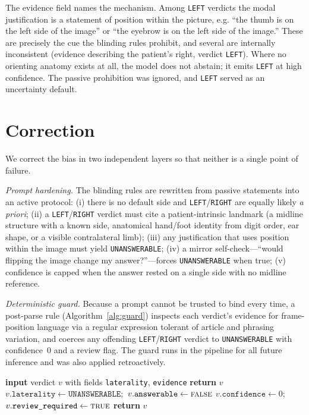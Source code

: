 \documentclass[conference]{IEEEtran}
\begin{document}
The evidence field names the mechanism. Among \texttt{LEFT} verdicts the modal justification is a statement of position within the picture, e.g. ``the thumb is on the left side of the image'' or ``the eyebrow is on the left side of the image.'' These are precisely the cue the blinding rules prohibit, and several are internally inconsistent (evidence describing the patient's right, verdict \texttt{LEFT}). Where no orienting anatomy exists at all, the model does not abstain; it emits \texttt{LEFT} at high confidence. The passive prohibition was ignored, and \texttt{LEFT} served as an uncertainty default.

\section{Correction}\label{sec:fix}
We correct the bias in two independent layers so that neither is a single point of failure.

\emph{Prompt hardening.} The blinding rules are rewritten from passive statements into an active protocol: (i) there is no default side and \texttt{LEFT}/\texttt{RIGHT} are equally likely \emph{a priori}; (ii) a \texttt{LEFT}/\texttt{RIGHT} verdict must cite a patient-intrinsic landmark (a midline structure with a known side, anatomical hand/foot identity from digit order, ear shape, or a visible contralateral limb); (iii) any justification that uses position within the image must yield \texttt{UNANSWERABLE}; (iv) a mirror self-check---``would flipping the image change my answer?''---forces \texttt{UNANSWERABLE} when true; (v) confidence is capped when the answer rested on a single side with no midline reference.

\emph{Deterministic guard.} Because a prompt cannot be trusted to bind every time, a post-parse rule (Algorithm~\ref{alg:guard}) inspects each verdict's evidence for frame-position language via a regular expression tolerant of article and phrasing variation, and coerces any offending \texttt{LEFT}/\texttt{RIGHT} verdict to \texttt{UNANSWERABLE} with confidence~0 and a review flag. The guard runs in the pipeline for all future inference and was also applied retroactively.

\begin{algorithm}[!t]
\caption{Frame-position guard}
\label{alg:guard}
\begin{algorithmic}[1]
\STATE \textbf{input} verdict $v$ with fields \texttt{laterality}, \texttt{evidence}
 \STATE \textbf{return} $v$ \ENDIF
{}
\STATE $v.\texttt{laterality}\gets\texttt{UNANSWERABLE}$;\ $v.\texttt{answerable}\gets\textsc{false}$
\STATE $v.\texttt{confidence}\gets 0$;\ $v.\texttt{review\_required}\gets\textsc{true}$
\ENDIF
\STATE \textbf{return} $v$
\end{algorithmic}
\end{algorithm}
\end{document}

